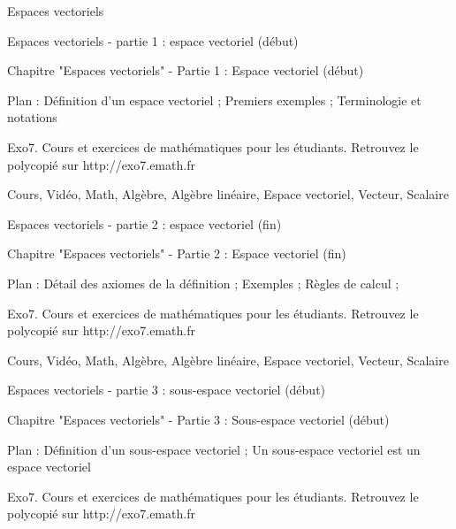 
   Espaces vectoriels




Espaces vectoriels - partie 1 : espace vectoriel (début)



Chapitre "Espaces vectoriels" - Partie 1 : Espace vectoriel (début)

Plan : Définition d'un espace vectoriel ; Premiers exemples ; Terminologie et notations

Exo7. Cours et exercices de mathématiques pour les étudiants.
Retrouvez le polycopié sur http://exo7.emath.fr


Cours, Vidéo, Math, Algèbre, Algèbre linéaire, Espace vectoriel, Vecteur, Scalaire 



Espaces vectoriels - partie 2 : espace vectoriel (fin)



Chapitre "Espaces vectoriels" - Partie 2 : Espace vectoriel (fin)

Plan : Détail des axiomes de la définition ; Exemples ; Règles de calcul ;


Exo7. Cours et exercices de mathématiques pour les étudiants.
Retrouvez le polycopié sur http://exo7.emath.fr


Cours, Vidéo, Math, Algèbre, Algèbre linéaire, Espace vectoriel, Vecteur, Scalaire



Espaces vectoriels - partie 3 : sous-espace vectoriel (début)



Chapitre "Espaces vectoriels" - Partie 3 : Sous-espace vectoriel (début)

Plan : Définition d'un sous-espace vectoriel ; Un sous-espace vectoriel est un espace vectoriel

Exo7. Cours et exercices de mathématiques pour les étudiants.
Retrouvez le polycopié sur http://exo7.emath.fr


